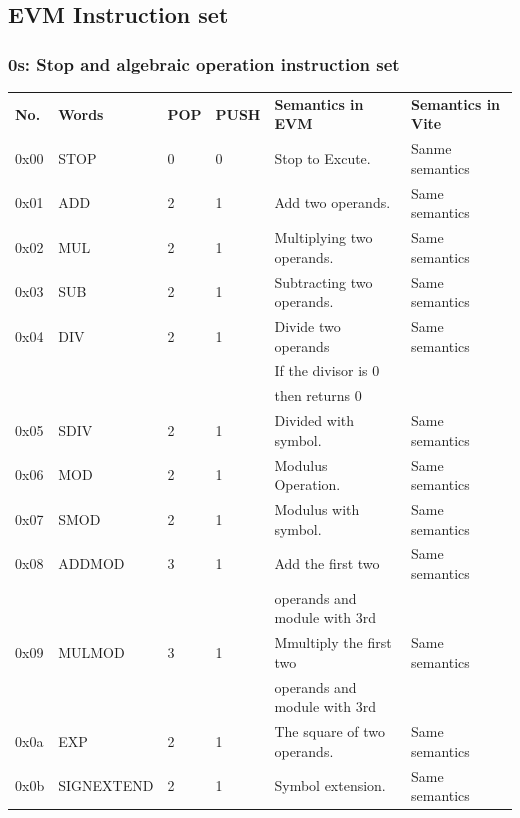 \documentclass[UTF8,nofonts]{article}
\begin{document}




\begin{appendices}

\section{EVM Instruction set\label{app:evm-instruction-set}}
\subsubsection{0s: Stop and algebraic operation instruction set}
\begin{tabu}{l l l l l l} 
\toprule

\textbf{No.} & \textbf{Words} & \textbf{POP} & \textbf{PUSH} & \textbf{Semantics in EVM} & \textbf{Semantics in Vite}  \vspace{5pt} \\
0x00 & {\small STOP} & 0 & 0 & Stop to Excute. &  Sanme semantics\\
\midrule
0x01 & {\small ADD} & 2 & 1 & Add two operands. & Same semantics\\
\midrule
0x02 & {\small MUL} & 2 & 1 & Multiplying two operands. & Same semantics\\
\midrule
0x03 & {\small SUB} & 2 & 1 & Subtracting two operands. & Same semantics\\
\midrule
0x04 & {\small DIV} & 2 & 1 & Divide two operands & Same semantics\\
&&&&  If the divisor is 0 \\ 
&&&&  then returns 0 \\

\midrule
0x05 & {\small SDIV} & 2 & 1 & Divided with symbol. & Same semantics\\
\midrule
0x06 & {\small MOD} & 2 & 1 & Modulus Operation. & Same semantics\\
\midrule
0x07 & {\small SMOD} & 2 & 1 & Modulus with symbol. & Same semantics\\
\midrule
0x08 & {\small ADDMOD} & 3 & 1 &Add the first two & Same semantics\\
&&&& operands and module with 3rd \\

\midrule
0x09 & {\small MULMOD} & 3 & 1 & Mmultiply the first two  & Same semantics\\
&&&& operands and module with 3rd \\
\midrule
0x0a & {\small EXP} & 2 & 1 & The square of two operands. & Same semantics\\
\midrule
0x0b & {\small SIGNEXTEND} & 2 & 1 & Symbol extension. & Same semantics\\
\midrule
\end{tabu}


\end{appendices}
\end{document}
